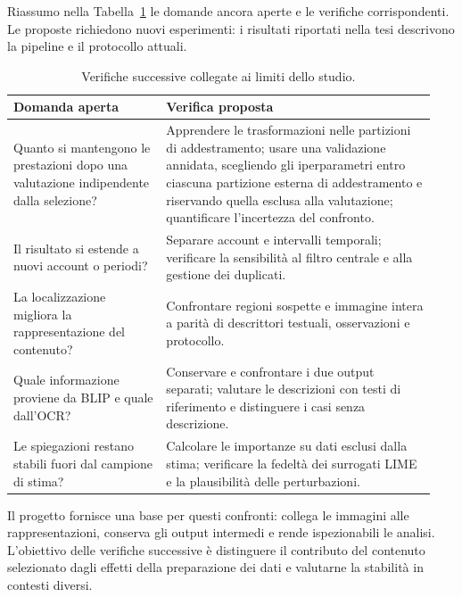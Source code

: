 Riassumo nella Tabella~\ref{tab:conclusioni-verifiche} le domande ancora aperte e le verifiche corrispondenti. Le proposte richiedono nuovi esperimenti: i risultati riportati nella tesi descrivono la pipeline e il protocollo attuali.

\begin{table}[htbp]
    \centering
    \small
    \caption{Verifiche successive collegate ai limiti dello studio.}
    \label{tab:conclusioni-verifiche}
    \begin{tabular}{@{}>{\raggedright\arraybackslash}p{0.34\linewidth}>{\raggedright\arraybackslash}p{0.60\linewidth}@{}}
        \toprule
        Domanda aperta & Verifica proposta \\
        \midrule
        Quanto si mantengono le prestazioni dopo una valutazione indipendente dalla selezione? & Apprendere le trasformazioni nelle partizioni di addestramento; usare una validazione annidata, scegliendo gli iperparametri entro ciascuna partizione esterna di addestramento e riservando quella esclusa alla valutazione; quantificare l'incertezza del confronto. \\
        \addlinespace
        Il risultato si estende a nuovi account o periodi? & Separare account e intervalli temporali; verificare la sensibilità al filtro centrale e alla gestione dei duplicati. \\
        \addlinespace
        La localizzazione migliora la rappresentazione del contenuto? & Confrontare regioni sospette e immagine intera a parità di descrittori testuali, osservazioni e protocollo. \\
        \addlinespace
        Quale informazione proviene da BLIP e quale dall'OCR? & Conservare e confrontare i due output separati; valutare le descrizioni con testi di riferimento e distinguere i casi senza descrizione. \\
        \addlinespace
        Le spiegazioni restano stabili fuori dal campione di stima? & Calcolare le importanze su dati esclusi dalla stima; verificare la fedeltà dei surrogati LIME e la plausibilità delle perturbazioni. \\
        \bottomrule
    \end{tabular}
\end{table}

\newpage
Il progetto fornisce una base per questi confronti: collega le immagini alle rappresentazioni, conserva gli output intermedi e rende ispezionabili le analisi. L'obiettivo delle verifiche successive è distinguere il contributo del contenuto selezionato dagli effetti della preparazione dei dati e valutarne la stabilità in contesti diversi.
